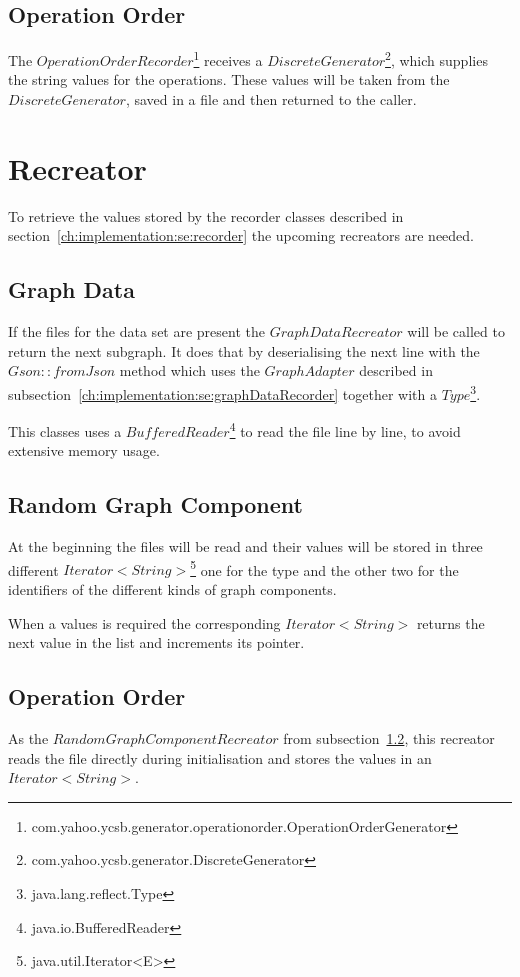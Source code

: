 \subsection{Operation Order}
\label{ch:implementation:se:operationOrderRecorder}
The $ OperationOrderRecorder $\footnote{com.yahoo.ycsb.generator.operationorder.OperationOrderGenerator} receives a $ DiscreteGenerator $\footnote{com.yahoo.ycsb.generator.DiscreteGenerator},
which supplies the string values for the operations.
These values will be taken from the $ DiscreteGenerator $,
saved in a file and then returned to the caller.

\section{Recreator}
\label{ch:implementation:se:recreator}
To retrieve the values stored by the recorder classes described in section~\ref{ch:implementation:se:recorder} the upcoming recreators are needed.

\subsection{Graph Data}
If the files for the data set are present the $ GraphDataRecreator $ will be called to return the next subgraph.
It does that by deserialising the next line with the $ Gson::fromJson $ method which uses the $ GraphAdapter $ described in subsection~\ref{ch:implementation:se:graphDataRecorder} together with a $ Type $\footnote{java.lang.reflect.Type}.

This classes uses a $ BufferedReader $\footnote{java.io.BufferedReader} to read the file line by line,
to avoid extensive memory usage.

\subsection{Random Graph Component}
\label{ch:implementation:se:randomGraphComponentRecreator}
At the beginning the files will be read and their values will be stored in three different $ Iterator<String> $\footnote{java.util.Iterator<E>} one for the type and the other two for the identifiers of the different kinds of graph components.

When a values is required the corresponding $ Iterator<String> $ returns the next value in the list and increments its pointer.

\subsection{Operation Order}
As the $ RandomGraphComponentRecreator $ from subsection~\ref{ch:implementation:se:randomGraphComponentRecreator},
this recreator reads the file directly during initialisation and stores the values in an $ Iterator<String> $.

